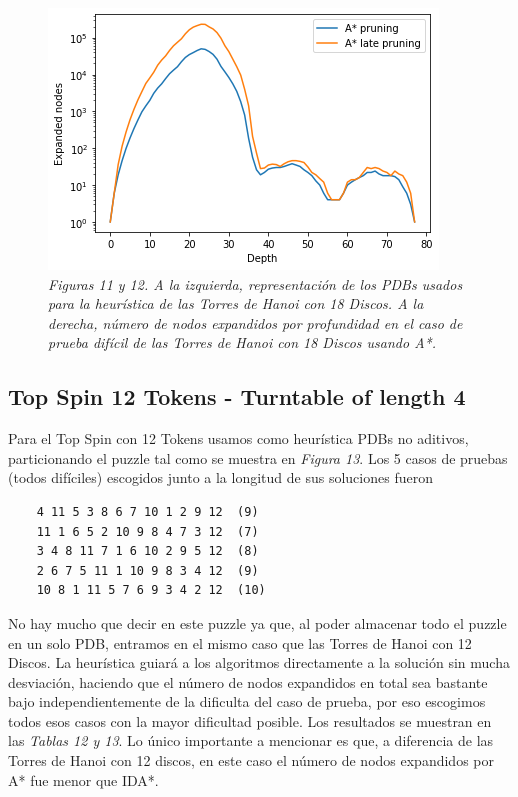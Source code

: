 \documentclass[a4paper,10pt]{article}
\begin{document}
\begin{figure}[t!]
      \includegraphics[scale=0.4]{hanois18D/hanois18_hard.png} \\
      \textit{\small{Figuras 11 y 12. A la izquierda, representaci\'on de los PDBs
      usados para la heur\'istica de las Torres de Hanoi con 18 Discos. A la derecha, n\'umero de nodos expandidos por profundidad en el caso de prueba
      dif\'icil de las Torres de Hanoi con 18 Discos usando A*.}}
    \end{figure}
    
  \subsection{Top Spin 12 Tokens - Turntable of length 4}
    Para el Top Spin con 12 Tokens usamos como heur\'istica PDBs no aditivos, 
    particionando el puzzle tal como se muestra en \textit{Figura 13}. Los 5 casos de pruebas (todos dif\'iciles) escogidos junto a la 
    longitud de sus soluciones fueron
    
    \begin{verbatim}
    4 11 5 3 8 6 7 10 1 2 9 12  (9)
    11 1 6 5 2 10 9 8 4 7 3 12  (7)
    3 4 8 11 7 1 6 10 2 9 5 12  (8)
    2 6 7 5 11 1 10 9 8 3 4 12  (9)
    10 8 1 11 5 7 6 9 3 4 2 12  (10)
    \end{verbatim}
    
    No hay mucho que decir en este puzzle ya que, al poder almacenar todo
    el puzzle en un solo PDB, entramos en el mismo caso que las Torres de
    Hanoi con 12 Discos. La heur\'istica guiar\'a a los algoritmos 
    directamente a la soluci\'on sin mucha desviaci\'on, haciendo que el
    n\'umero de nodos expandidos en total sea bastante bajo independientemente
    de la dificulta del caso de prueba, por eso escogimos todos esos casos 
    con la mayor dificultad posible. Los resultados se muestran en las 
    \textit{Tablas 12 y 13}. Lo \'unico importante a mencionar es que, a
    diferencia de las Torres de Hanoi con 12 discos, en este caso el n\'umero
    de nodos expandidos por A* fue menor que IDA*.
    
\end{document}
